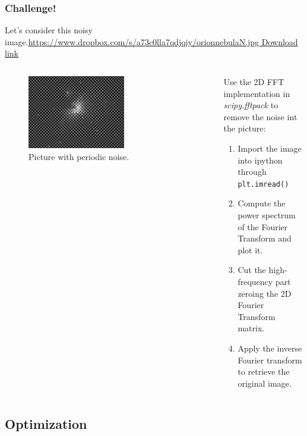 \documentclass[10pt,colorlinks]{beamer}
\begin{document}
\begin{frame}[fragile]\frametitle{Challenge!}
Let's consider this noisy image.\tiny{\href{https://www.dropbox.com/s/a73c0lla7qdjqiy/orionnebulaN.jpg}{https://www.dropbox.com/s/a73c0lla7qdjqiy/orionnebulaN.jpg Download link}}

 \begin{columns}[c]

    \begin{figure}[!htb]
      \centering
     \includegraphics[width=0.6\textwidth]{challenges/orionnebulaN}
     \caption{Picture with periodic noise.}
     \label{fig:}
    \end{figure}
    \begin{block}{}
    Use the 2D FFT implementation in \emph{scipy.fftpack} to remove the noise int the picture:
        \begin{enumerate}
            \item Import the image into ipython through \verb|plt.imread()|
            \item Compute the power spectrum of the Fourier Transform and plot it. 
            \item Cut the high-frequency part zeroing the 2D Fourier Transform matrix. 
             \item Apply the inverse Fourier transform to retrieve the original image.
        \end{enumerate}
    \end{block}
 \end{columns}

\end{frame}




\subsection{Optimization}
\end{document}
